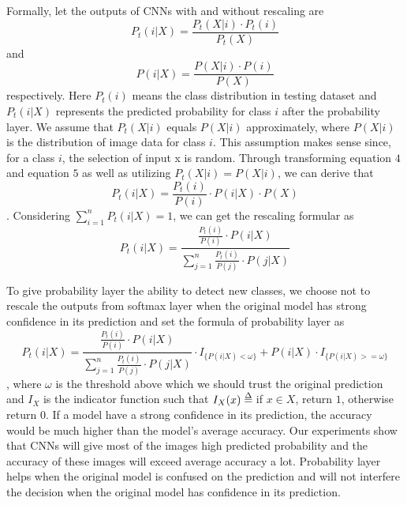 \documentclass[pageno]{jpaper}
\def\delequal{\mathrel{\ensurestackMath{\stackon[1pt]{=}{\scriptstyle\Delta}}}}
\begin{document}
Formally, let the outputs of CNNs with and without rescaling are
\begin{equation}
    P_t(i|X) = \frac{P_t(X|i) \cdot P_t(i)}{P_t(X)}
\end{equation}
and
\begin{equation}
    P(i|X) = \frac{P(X|i) \cdot P(i)}{P(X)}
\end{equation}
respectively. Here $P_t(i)$ means the class distribution in testing dataset and $P_t(i|X)$ represents the predicted probability for class $i$ after the probability layer. We assume that $P_t(X|i)$ equals $P(X|i)$ approximately, where $P(X|i)$ is the distribution of image data for class $i$. This assumption makes sense since, for a class $i$, the selection of input x is random. Through transforming equation $4$ and equation $5$ as well as utilizing $P_t(X|i) = P(X|i)$, we can derive that 
\begin{equation}
    P_t(i|X) = \frac{P_t(i)}{P(i)}\cdot P(i|X) \cdot P(X) 
\end{equation}. Considering $\sum_{i=1}^n P_t(i|X) = 1$, we can get the rescaling formular as
\begin{equation}
    P_t(i|X) = \frac{\frac{P_t(i)}{P(i)} \cdot P(i|X)}{\sum_{j=1}^n \frac{P_t(i)}{P(j)} \cdot P(j|X)}
\end{equation}


To give probability layer the ability to detect new classes, we choose not to rescale the outputs from softmax layer when the original model has strong confidence in its prediction and set the formula of probability layer as
\begin{equation} \label{eq: recover}
    P_t(i|X) = \frac{\frac{P_t(i)}{P(i)} \cdot P(i|X)}{\sum_{j=1}^n \frac{P_t(i)}{P(j)} \cdot P(j|X)} \cdot I_{\{P(i|X) < \omega\}} + P(i|X) \cdot I_{\{P(i|X) >= \omega\}} 
\end{equation}
, where $\omega$ is the threshold above which we should trust the original prediction and $I_X$ is the indicator function such that
$I_X(x) \delequal \; $if $x\in X$, return $1$, otherwise return $0$.
If a model have a strong confidence in its prediction, the accuracy would be much higher than the model's average accuracy. Our experiments show that CNNs will give most of the images high predicted probability and the accuracy of these images will exceed average accuracy a lot. Probability layer helps when the original model is confused on the prediction and will not interfere the decision when the original model has confidence in its prediction.
\end{document}

